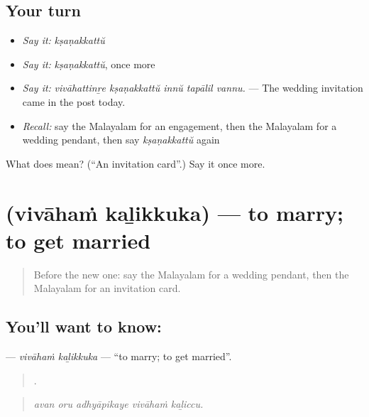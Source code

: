 \subsection*{Your turn}
\begin{itemize}
\raggedright
  \item \emph{Say it:} \emph{kṣaṇakkattŭ}
  \item \emph{Say it:} \emph{kṣaṇakkattŭ}, once more
  \item \emph{Say it:} \emph{vivāhattinṟe kṣaṇakkattŭ innŭ tapālil vannu.} — The wedding invitation came in the post today.
  \item \emph{Recall:} say the Malayalam for an engagement, then the Malayalam for a wedding pendant, then say \emph{kṣaṇakkattŭ} again
\end{itemize}

\begin{tcolorbox}[breakable,colback=teal!4,colframe=teal!35!black,title={Before you move on}]
What does  mean? (\textquotedblleft{}An invitation card\textquotedblright{}.) Say it once more.
\end{tcolorbox}
\section[\texorpdfstring{\ml{വിവാഹം} \ml{കഴിക്കുക} (vivāhaṁ kaḻikkuka)}{വിവാഹം കഴിക്കുക (vivāhaṁ kaḻikkuka)}]{  (vivāhaṁ kaḻikkuka) — to marry; to get married}

\label{lesson:ML-C385-vivaham-kalikkuka}



\begin{quote}
Before the new one: say the Malayalam for a wedding pendant, then the Malayalam for an invitation card.
\end{quote}

\subsection*{You'll want to know:  }
\textbf{ } — \emph{vivāhaṁ kaḻikkuka} — \textquotedblleft{}to marry; to get married\textquotedblright{}.

\begin{quote}
    .
\end{quote}

\begin{quote}
\emph{avan oru adhyāpikaye vivāhaṁ kaḻiccu.}
\end{quote}

